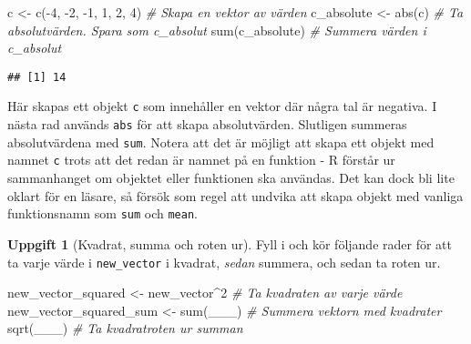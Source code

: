 \documentclass[
]{book}
\newenvironment{Shaded}{\begin{snugshade}}{\end{snugshade}}
\newcommand{\CommentTok}[1]{\textcolor[rgb]{0.56,0.35,0.01}{\textit{#1}}}
\newcommand{\DecValTok}[1]{\textcolor[rgb]{0.00,0.00,0.81}{#1}}
\newcommand{\FunctionTok}[1]{\textcolor[rgb]{0.00,0.00,0.00}{#1}}
\newcommand{\NormalTok}[1]{#1}
\newcommand{\OtherTok}[1]{\textcolor[rgb]{0.56,0.35,0.01}{#1}}
\newcommand{\SpecialCharTok}[1]{\textcolor[rgb]{0.00,0.00,0.00}{#1}}
\theoremstyle{definition}
\theoremstyle{definition}
\theoremstyle{definition}
\newtheorem{exercise}{Uppgift}[chapter]
\theoremstyle{definition}
\theoremstyle{remark}
\begin{document}
\begin{Shaded}
\begin{Highlighting}[]
\NormalTok{c }\OtherTok{\textless{}{-}} \FunctionTok{c}\NormalTok{(}\SpecialCharTok{{-}}\DecValTok{4}\NormalTok{, }\SpecialCharTok{{-}}\DecValTok{2}\NormalTok{, }\SpecialCharTok{{-}}\DecValTok{1}\NormalTok{, }\DecValTok{1}\NormalTok{, }\DecValTok{2}\NormalTok{, }\DecValTok{4}\NormalTok{)            }\CommentTok{\# Skapa en vektor av värden}
\NormalTok{c\_absolute }\OtherTok{\textless{}{-}} \FunctionTok{abs}\NormalTok{(c)                   }\CommentTok{\# Ta absolutvärden. Spara som c\_absolut}
\FunctionTok{sum}\NormalTok{(c\_absolute)                        }\CommentTok{\# Summera värden i c\_absolut}
\end{Highlighting}
\end{Shaded}

\begin{verbatim}
## [1] 14
\end{verbatim}

Här skapas ett objekt \texttt{c} som innehåller en vektor där några tal är negativa. I nästa rad används \texttt{abs} för att skapa absolutvärden. Slutligen summeras absolutvärdena med \texttt{sum}.
Notera att det är möjligt att skapa ett objekt med namnet \texttt{c} trots att det redan är namnet på en funktion - R förstår ur sammanhanget om objektet eller funktionen ska användas. Det kan dock bli lite oklart för en läsare, så försök som regel att undvika att skapa objekt med vanliga funktionsnamn som \texttt{sum} och \texttt{mean}.

\begin{exercise}[Kvadrat, summa och roten ur]

Fyll i och kör följande rader för att ta varje värde i \texttt{new\_vector} i kvadrat, \emph{sedan} summera, och sedan ta roten ur.

\begin{Shaded}
\begin{Highlighting}[]
\NormalTok{new\_vector\_squared }\OtherTok{\textless{}{-}}\NormalTok{ new\_vector}\SpecialCharTok{\^{}}\DecValTok{2}     \CommentTok{\# Ta kvadraten av varje värde}
\NormalTok{new\_vector\_squared\_sum }\OtherTok{\textless{}{-}} \FunctionTok{sum}\NormalTok{(\_\_\_)     }\CommentTok{\# Summera vektorn med kvadrater}
\FunctionTok{sqrt}\NormalTok{(\_\_\_)                              }\CommentTok{\# Ta kvadratroten ur summan}
\end{Highlighting}
\end{Shaded}

\end{exercise}
\end{document}
